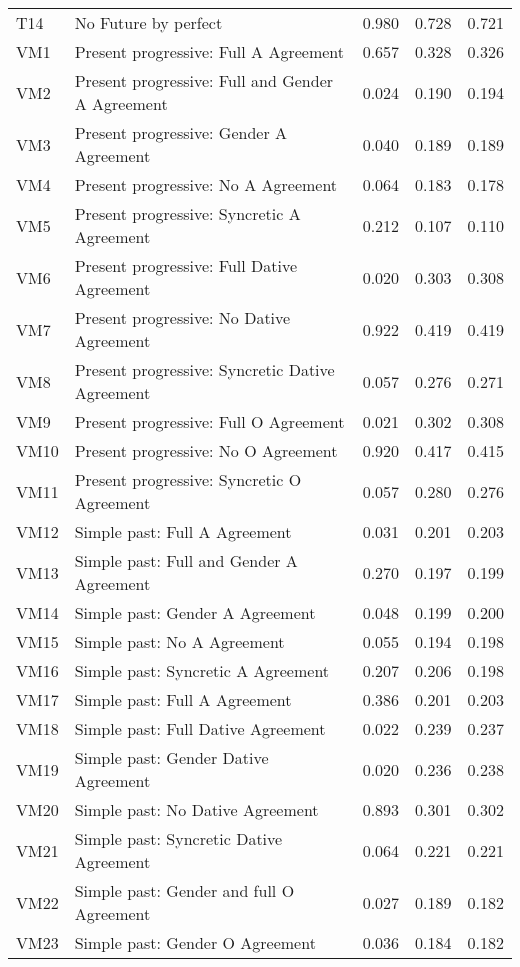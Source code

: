 \begin{longtable}{lllll}
T14 & No Future by perfect & 0.980 & 0.728 & 0.721\\
VM1 & Present progressive: Full A Agreement & 0.657 & 0.328 & 0.326\\
VM2 & Present progressive: Full and Gender A Agreement & 0.024 & 0.190 & 0.194\\
VM3 & Present progressive: Gender A Agreement & 0.040 & 0.189 & 0.189\\
VM4 & Present progressive: No A Agreement & 0.064 & 0.183 & 0.178\\
VM5 & Present progressive: Syncretic A Agreement & 0.212 & 0.107 & 0.110\\
VM6 & Present progressive: Full Dative Agreement & 0.020 & 0.303 & 0.308\\
VM7 & Present progressive: No Dative Agreement & 0.922 & 0.419 & 0.419\\
VM8 & Present progressive: Syncretic Dative Agreement & 0.057 & 0.276 & 0.271\\
VM9 & Present progressive: Full O Agreement & 0.021 & 0.302 & 0.308\\
VM10 & Present progressive: No O Agreement & 0.920 & 0.417 & 0.415\\
VM11 & Present progressive: Syncretic O Agreement & 0.057 & 0.280 & 0.276\\
VM12 & Simple past: Full A Agreement & 0.031 & 0.201 & 0.203\\
VM13 & Simple past: Full and Gender A Agreement & 0.270 & 0.197 & 0.199\\
VM14 & Simple past: Gender A Agreement & 0.048 & 0.199 & 0.200\\
VM15 & Simple past: No A Agreement & 0.055 & 0.194 & 0.198\\
VM16 & Simple past: Syncretic A Agreement & 0.207 & 0.206 & 0.198\\
VM17 & Simple past: Full A Agreement & 0.386 & 0.201 & 0.203\\
VM18 & Simple past: Full Dative Agreement & 0.022 & 0.239 & 0.237\\
VM19 & Simple past: Gender Dative Agreement & 0.020 & 0.236 & 0.238\\
VM20 & Simple past: No Dative Agreement & 0.893 & 0.301 & 0.302\\
VM21 & Simple past: Syncretic Dative Agreement & 0.064 & 0.221 & 0.221\\
VM22 & Simple past: Gender and full O Agreement & 0.027 & 0.189 & 0.182\\
VM23 & Simple past: Gender O Agreement & 0.036 & 0.184 & 0.182\\

\end{longtable}
